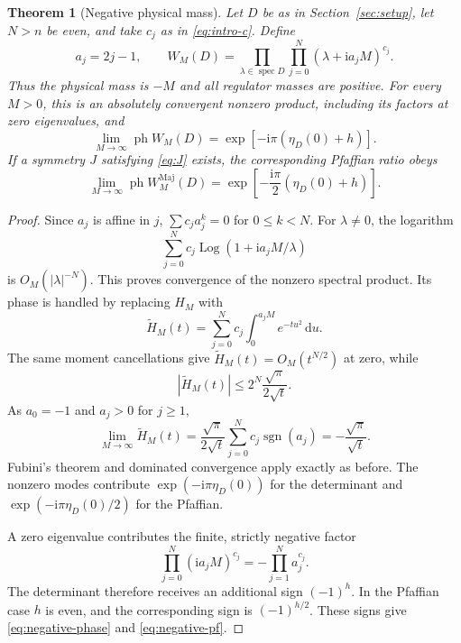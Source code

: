 \documentclass[11pt,a4paper]{article}
\newtheorem{theorem}{Theorem}[section]
\theoremstyle{remark}
\DeclareMathOperator{\sgn}{sgn}
\DeclareMathOperator{\spec}{spec}
\DeclareMathOperator{\Log}{Log}
\DeclareMathOperator{\ph}{ph}
\newcommand{\ii}{\mathrm i}
\newcommand{\dd}{\,\mathrm d}
\newcommand{\Maj}{\mathrm{Maj}}
\numberwithin{equation}{section}
\begin{document}
\begin{theorem}[Negative physical mass]\label{thm:negative}
Let $D$ be as in Section~\ref{sec:setup}, let $N>n$ be even, and
take $c_j$ as in \eqref{eq:intro-c}. Define
\begin{equation}\label{eq:negative-product}
 a_j=2j-1,
 \qquad W_M(D)=\prod_{\lambda\in\spec D}
                       \prod_{j=0}^N(\lambda+\ii a_jM)^{c_j}.
\end{equation}
Thus the physical mass is $-M$ and all regulator masses are positive.
For every $M>0$, this is an absolutely convergent nonzero product,
including its factors at zero eigenvalues, and
\begin{equation}\label{eq:negative-phase}
 \lim_{M\to\infty}\ph W_M(D)
 =\exp[-\ii\pi(\eta_D(0)+h)].
\end{equation}
If a symmetry $J$ satisfying \eqref{eq:J} exists, the corresponding
Pfaffian ratio obeys
\begin{equation}\label{eq:negative-pf}
 \lim_{M\to\infty}\ph W_M^{\Maj}(D)
 =\exp\!\left[-\frac{\ii\pi}{2}(\eta_D(0)+h)\right].
\end{equation}
\end{theorem}

\begin{proof}
Since $a_j$ is affine in $j$, $\sum c_ja_j^k=0$ for $0\le k<N$.
For $\lambda\ne0$, the logarithm
\[
 \sum_{j=0}^Nc_j\Log(1+\ii a_jM/\lambda)
\]
is $O_M(|\lambda|^{-N})$. This proves convergence of the nonzero
spectral product. Its phase is handled by replacing $H_M$ with
\begin{equation}\label{eq:H-negative}
 \widetilde H_M(t)=\sum_{j=0}^Nc_j
                         \int_0^{a_jM}e^{-tu^2}\dd u.
\end{equation}
The same moment cancellations give
$\widetilde H_M(t)=O_M(t^{N/2})$ at zero, while
\begin{equation}
 |\widetilde H_M(t)|\le 2^N\frac{\sqrt\pi}{2\sqrt t}.
\end{equation}
As $a_0=-1$ and $a_j>0$ for $j\ge1$,
\begin{equation}\label{eq:H-negative-limit}
 \lim_{M\to\infty}\widetilde H_M(t)
 =\frac{\sqrt\pi}{2\sqrt t}\sum_{j=0}^Nc_j\sgn(a_j)
 =-\frac{\sqrt\pi}{\sqrt t}.
\end{equation}
Fubini's theorem and dominated convergence apply exactly as before.
The nonzero modes contribute $\exp(-\ii\pi\eta_D(0))$ for the
determinant and $\exp(-\ii\pi\eta_D(0)/2)$ for the Pfaffian.

A zero eigenvalue contributes the finite, strictly negative factor
\begin{equation}\label{eq:zero-factor}
 \prod_{j=0}^N(\ii a_jM)^{c_j}
 =-\prod_{j=1}^Na_j^{c_j}.
\end{equation}
The determinant therefore receives an additional sign $(-1)^h$.
In the Pfaffian case $h$ is even, and the corresponding sign is
$(-1)^{h/2}$. These signs give \eqref{eq:negative-phase} and
\eqref{eq:negative-pf}.
\end{proof}
\end{document}
